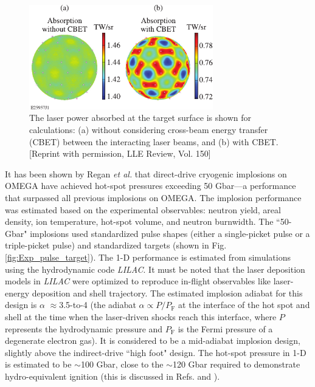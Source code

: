 \documentclass[aip,reprint]{revtex4-1}
\begin{document}
%
%
%
%
%
%
%
%
\begin{figure}
\includegraphics[width=80mm]{Fig2_Bose}
\caption{\label{fig:Exp_CBET}The laser power absorbed at the target surface is shown for calculations: (a) without considering cross-beam energy transfer (CBET) between the interacting laser beams, and (b) with CBET. [Reprint with permission, LLE Review, Vol. 150]}
\end{figure}
%
%


 It has been shown by Regan \textit{et al.}\cite{Exp_Regan} that direct-drive cryogenic implosions on OMEGA have achieved hot-spot pressures exceeding 50 Gbar---a performance that surpassed all previous implosions on OMEGA. The implosion performance was estimated based on the experimental observables: neutron yield, areal density, ion temperature, hot-spot volume, and neutron burnwidth. The ``50-Gbar" implosions used standardized pulse shapes (either a single-picket pulse or a triple-picket pulse) and standardized targets (shown in Fig. \ref{fig:Exp_pulse_target}). The 1-D performance is estimated from simulations using the hydrodynamic code \textit{LILAC}.\cite{Exp_LILAC1} It must be noted that the laser deposition models in \textit{LILAC} were optimized to reproduce in-flight observables like laser-energy deposition and shell trajectory.\cite{Exp_LILAC2, Exp_LILAC3} The estimated implosion adiabat for this design is $\alpha$ $\approx$3.5-to-4 (the adiabat $\alpha \propto P/P_\text{F}$ at the interface of the hot spot and shell at the time when the laser-driven shocks reach this interface, where $P$ represents the hydrodynamic pressure and $P_\text{F}$ is the Fermi pressure of a degenerate electron gas). It is considered to be a mid-adiabat implosion design, slightly above the indirect-drive ``high foot" design. The hot-spot pressure in 1-D is estimated to be $\sim$100 Gbar, close to the $\sim$120 Gbar required to demonstrate hydro-equivalent ignition (this is discussed in Refs.  and ). 
\end{document}
